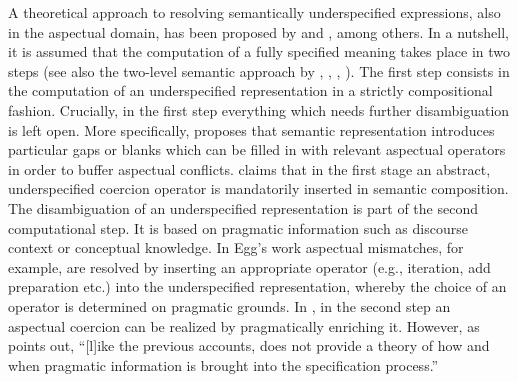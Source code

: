 \documentclass[output=paper]{langscibook}
\begin{document}
A theoretical approach to resolving semantically underspecified expressions, also in the aspectual domain, has been proposed by \citet{Dolling1995, Dolling1997, Dolling2001, Dolling2003b,Dolling2003a, Dolling2014} and \citet{Egg2005}, among others.  In a nutshell, it is assumed that the computation of a fully specified meaning takes place in two steps (see also the two-level semantic approach by \citealt{Bierwisch1983, Bierwisch1997, Bierwisch2007}, \citealt{BierwishandLang1989}, \citealt{BierwischandSchreuder1992}, \citealt{Lang1994}). The first step consists in the computation of an underspecified representation in a strictly compositional fashion. Crucially, in the first step everything which needs further disambiguation is left open. More specifically, \citet{Egg2005} proposes that semantic representation introduces particular gaps or blanks which can be filled in with relevant aspectual operators in order to buffer aspectual conflicts. \citet{Dolling2014} claims that in the first stage an abstract, underspecified coercion operator is mandatorily inserted in semantic composition. The disambiguation of an underspecified representation is part of the second computational step. It is based on pragmatic information such as discourse context or conceptual knowledge. In Egg’s work aspectual mismatches, for example, are resolved by inserting an appropriate operator (e.g., iteration, add preparation etc.) into the underspecified representation, whereby the choice of an operator is determined on pragmatic grounds. In \citet{Dolling2014}, in the second step an aspectual coercion can be realized by pragmatically enriching it. However, as \citet[47]{Bott2010} points out, “[l]ike the previous accounts, \citet{ Egg2005} does not provide a theory of how and when pragmatic information is brought into the specification process.” 
\end{document}
